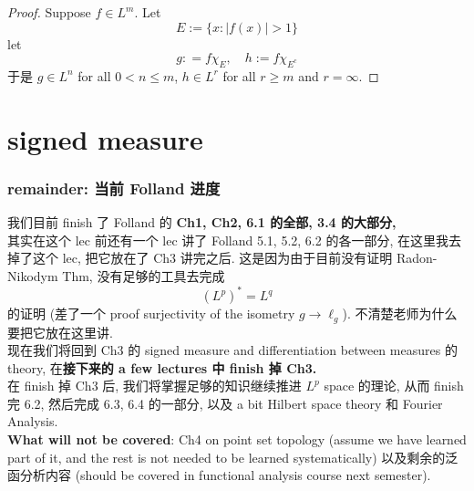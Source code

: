 \documentclass[lang=cn,11pt]{elegantbook}
\begin{document}
\begin{proof}
Suppose $f \in L^m$. Let \[
E:= \{ x:|f(x)|>1\} 
\]
let \[
g: = f\chi_E,\quad h := f \chi_{E^c}
\]
于是 $g \in L^n$ for all $0< n \leq m$, $h \in L^r$ for all $r \geq m$ and $r= \infty$.
\end{proof}







\chapter{signed measure}
\subsection{remainder: 当前 Folland 进度}
我们目前 finish 了 Folland 的\textbf{ Ch1, Ch2, 6.1 的全部, 3.4 的大部分, }\\
其实在这个 lec 前还有一个 lec 讲了 Folland 5.1, 5.2, 6.2 的各一部分, 在这里我去掉了这个 lec, 把它放在了 Ch3 讲完之后.  这是因为由于目前没有证明 Radon-Nikodym Thm, 没有足够的工具去完成 \[
(L^p)^* = L^q
\]
的证明 (差了一个 proof surjectivity of the isometry $g \to \ell_g$). 不清楚老师为什么要把它放在这里讲.\\
现在我们将回到 Ch3 的 signed measure and differentiation between measures 的 theory, 在\textbf{接下来的 a few lectures 中 finish 掉 Ch3.}\\
在 finish 掉 Ch3 后, 我们将掌握足够的知识继续推进 $L^p$ space 的理论, 从而 finish 完 6.2, 然后完成 6.3, 6.4 的一部分, 以及 a bit Hilbert space theory 和 Fourier Analysis.\\
\textbf{What will not be covered}: Ch4 on point set topology (assume we have learned part of it, and the rest is not needed to be learned systematically) 以及剩余的泛函分析内容 (should be covered in functional analysis course next semester).
\end{document}
